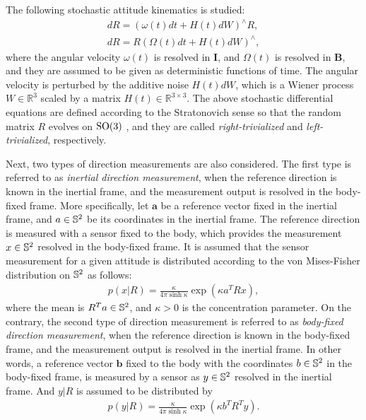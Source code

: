 The following stochastic attitude kinematics is studied:
\begin{align}
	dR = (\omega(t) dt + H(t) dW)^\wedge R, \label{eqn:observability-kinematics-right} \\
	dR = R (\Omega(t) dt + H(t) dW)^\wedge, \label{eqn:observability-kinematics-left}
\end{align}
where the angular velocity $\omega(t)$ is resolved in $\mathbf{I}$, and $\Omega(t)$ is resolved in $\mathbf{B}$, and they are assumed to be given as deterministic functions of time.
The angular velocity is perturbed by the additive noise $H(t)dW$, which is a Wiener process $W\in\mathbb{R}^3$ scaled by a matrix $H(t)\in\mathbb{R}^{3\times 3}$. 
The above stochastic differential equations are defined according to the Stratonovich sense so that the random matrix $R$ evolves on $\mathrm{SO}(3)$ \cite{barrau2018stochastic}, and they are called \textit{right-trivialized} and \textit{left-trivialized}, respectively.

Next, two types of direction measurements are also considered.
The first type is referred to as \textit{inertial direction measurement}, when the reference direction is known in the inertial frame, and the measurement output is resolved in the body-fixed frame.
More specifically, let $\bm{a}$ be a reference vector fixed in the inertial frame, and $a\in\mathbb{S}^2$ be its coordinates in the inertial frame.
The reference direction is measured with a sensor fixed to the body, which provides the measurement $x\in\mathbb{S}^2$ resolved in the body-fixed frame. 
It is assumed that the sensor measurement for a given attitude is distributed according to the von Mises-Fisher distribution on $\mathbb{S}^2$ as follows:
\begin{align} \label{eqn:observability-measurement-inertial}
	p(x|R) = \frac{\kappa}{4\pi\sinh \kappa} \exp( \kappa a^T Rx),
\end{align}
where the mean is $R^Ta\in\mathbb{S}^2$, and $\kappa>0$ is the concentration parameter.
On the contrary, the second type of direction measurement is referred to as \textit{body-fixed direction measurement}, when the reference direction is known in the body-fixed frame, and the measurement output is resolved in the inertial frame.
In other words, a reference vector $\bm{b}$ fixed to the body with the coordinates $b\in\mathbb{S}^2$ in the body-fixed frame, is measured by a sensor as $y\in\mathbb{S}^2$ resolved in the inertial frame.
And $y|R$ is assumed to be distributed by
\begin{align} \label{eqn:observability-measurement-body}
	p(y|R) = \frac{\kappa}{4\pi\sinh \kappa} \exp( \kappa b^T R^T y).
\end{align}

